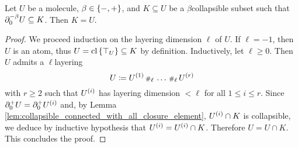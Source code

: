 \begin{lem} \label{lem:collapsible_negbeta_boundary_collapse_all}
    Let \( U \) be a molecule, \( \beta \in \set{-, +} \), and \( K \subseteq U \) be a \( \beta \)\nbd collapsible subset such that \( \bd{0}{-\beta} U \subseteq K \).
    Then \( K = U \).
\end{lem}
\begin{proof}
    We proceed induction on the layering dimension \( \ell \) of \( U \).
    If \( \ell = -1 \), then \( U \) is an atom, thus \( U = \clset{\top_U} \subseteq K \) by definition.
    Inductively, let \( \ell \geq 0 \). Then \( U \) admits a \( \ell \)\nbd layering
    \begin{equation*}
        U \eqdef \order{1}{U} \cp{\ell} \ldots \cp{\ell} \order{r}{U}
    \end{equation*}
    with \( r \geq 2 \) such that \( \order{i}{U} \) has layering dimension \( < \ell \) for all \( 1 \le i \le r \).
    Since \( \bd{0}{+} U = \bd{0}{+} \order{i}{U} \) and, by Lemma \ref{lem:collapsible_connected_with_all_closure_element}, \( \order{i}{U} \cap K \) is collapsible, we deduce by inductive hypothesis that \( \order{i}{U} = \order{i}{U} \cap K \).
    Therefore \( U = U \cap K \).
    This concludes the proof.
\end{proof}

